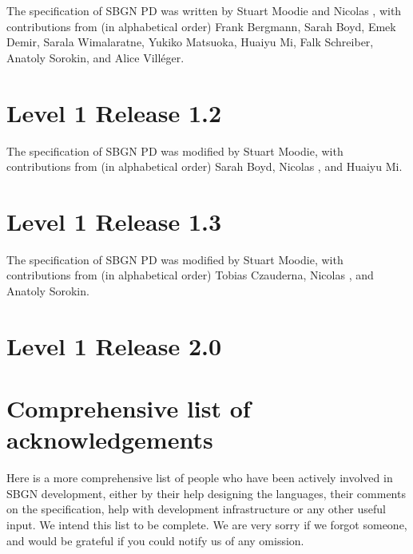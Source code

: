 The specification of SBGN PD  was written by Stuart Moodie and Nicolas \lenov{}, with contributions from (in alphabetical order) Frank Bergmann, Sarah Boyd, Emek Demir, Sarala Wimalaratne, Yukiko Matsuoka, Huaiyu Mi, Falk Schreiber, Anatoly Sorokin, and Alice Vill\'{e}ger.

\section{Level 1 Release 1.2}

The specification of SBGN PD  was modified by Stuart Moodie, with contributions from (in alphabetical order) Sarah Boyd, Nicolas \lenov{}, and Huaiyu Mi.

\section{Level 1 Release 1.3}

The specification of SBGN PD  was modified by Stuart Moodie, with contributions from (in alphabetical order) Tobias Czauderna, Nicolas \lenov{}, and Anatoly Sorokin.

\section{Level 1 Release 2.0}


\section{Comprehensive list of acknowledgements}

Here is a more comprehensive list of people who have been actively involved in SBGN development, either by their help designing the languages, their comments on the specification, help with development infrastructure or any other useful input.  We intend this list to be complete. We are very sorry if we forgot someone, and would be grateful if you could notify us of any omission.

